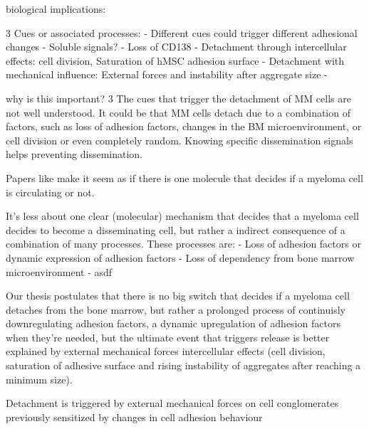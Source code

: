 \unnsubsection{\caddtriggertitle}%
\label{sec:discussion_caddtrigger}%

biological implications:

3 Cues or associated processes:
- Different cues could trigger different adhesional changes
- Soluble signals?
- Loss of CD138 \cite{akhmetzyanovaDynamicCD138Surface2020}
- Detachment through intercellular effects: cell division, Saturation of hMSC adhesion surface
- Detachment with mechanical influence: External forces and instability after aggregate size
-


why is this important?
3 The cues that trigger the detachment of MM cells are not well understood. It
could be that MM cells detach due to a combination of factors, such as loss of
adhesion factors, changes in the BM microenvironment, or cell division or
even completely random. Knowing specific dissemination signals helps preventing
dissemination.


Papers like \citet{akhmetzyanovaDynamicCD138Surface2020} make it seem as if
there is one molecule that decides if a myeloma cell is circulating or not.

It's less about one clear (molecular) mechanism that decides that a myeloma cell
decides to become a disseminating cell, but rather a indirect consequence of a combination of many
processes.
These processes are:
- Loss of adhesion factors or dynamic expression of adhesion factors
- Loss of dependency from bone marrow microenvironment
- asdf

Our thesis postulates that there is no big switch that decides if a myeloma cell
detaches from the bone marrow, but rather a prolonged process of continuisly
downregulating adhesion factors, a dynamic upregulation of adhesion factors when
they're needed, but the ultimate event that triggers release is better
explained by external mechanical forces intercellular effects (cell division,
saturation of adhesive surface and rising instability of aggregates after
reaching a minimum size).

Detachment is triggered by external mechanical forces on cell
conglomerates previously sensitized by changes in cell adhesion behaviour

